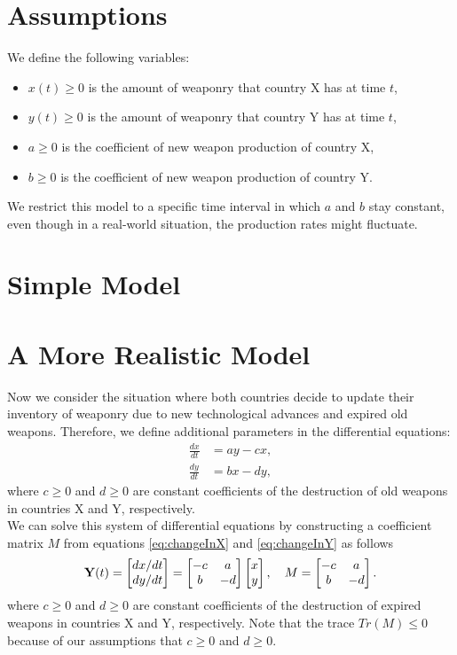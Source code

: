 \section{Assumptions}
We define the following variables:
\begin{itemize}
\item $x(t) \ge 0$ is the amount of weaponry that country X has at time $t$,
\item $y(t) \ge 0$ is the amount of weaponry that country Y has at time $t$,
\item $a \ge 0$ is the coefficient of new weapon production of country X,
\item $b \ge 0$ is the coefficient of new weapon production of country Y.
\end{itemize}
We restrict this model to a specific time interval in which $a$ and $b$ stay constant, even though in a real-world situation, the production rates might fluctuate.

\section{Simple Model}		

\section{A More Realistic Model}
Now we consider the situation where both countries decide to update their inventory of weaponry due to new technological advances and expired old weapons. 
Therefore, we define additional parameters in the differential equations:
\begin{align}
\frac{dx}{dt} & = ay - cx \label{eq:changeInX}, \\
\frac{dy}{dt} & = bx - dy \label{eq:changeInY},
\end{align}	
where $c \ge 0$ and $d \ge 0$ are constant coefficients of the destruction of old weapons in countries X and Y, respectively. \\
We can solve this system of differential equations by constructing a coefficient matrix $M$ from equations \eqref{eq:changeInX} and \eqref{eq:changeInY} as follows
\[
\bold{Y}(t) = 
 \begin{bmatrix}
	dx/dt \\ dy/dt
 \end{bmatrix}
= \begin{bmatrix}
    -c & a\\ 
    b & -d
  \end{bmatrix}
  \begin{bmatrix}
    x \\ y
  \end{bmatrix}, \quad
  M=
  \begin{bmatrix}
    -c & a\\ 
    b & -d
  \end{bmatrix}.
  \]
where $c \ge 0$ and $d \ge 0$ are constant coefficients of the destruction of expired weapons in countries X and Y, respectively. 
Note that the trace $Tr(M)\le0$ because of our assumptions that $c \ge 0$ and $d \ge 0$.

